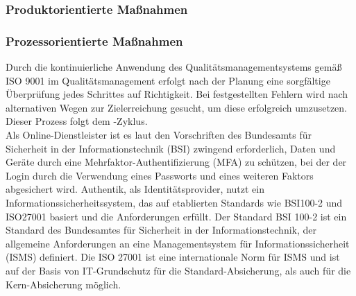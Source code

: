 \subsubsection{Produktorientierte Maßnahmen}
\label{sec:ProduktorientierteMaßnahmen}

\subsubsection{Prozessorientierte Maßnahmen}
\label{sec:ProzessorientierteMaßnahmen}
Durch die kontinuierliche Anwendung des Qualitätsmanagementsystems gemäß ISO 9001 im Qualitätsmanagement erfolgt nach der Planung 
eine sorgfältige Überprüfung jedes Schrittes auf Richtigkeit. Bei festgestellten Fehlern wird nach alternativen Wegen zur 
Zielerreichung gesucht, um diese erfolgreich umzusetzen. Dieser Prozess folgt dem \cite{pdca}-Zyklus.
\\Als Online-Dienstleister ist es laut den Vorschriften des Bundesamts für Sicherheit in der Informationstechnik (BSI) 
zwingend erforderlich, Daten und Geräte durch eine Mehrfaktor-Authentifizierung (\acs{MFA}) zu schützen, bei der der Login durch 
die Verwendung eines Passworts und eines weiteren Faktors abgesichert wird. Authentik, als Identitätsprovider, nutzt ein 
Informationssicherheitssystem, das auf etablierten Standards wie BSI100-2 und ISO27001 basiert und die Anforderungen erfüllt.
Der Standard \acs{BSI} 100-2 ist ein Standard des Bundesamtes für Sicherheit in der Informationstechnik, der allgemeine Anforderungen 
an eine Managementsystem für Informationssicherheit (\acs{ISMS}) definiert. Die ISO 27001 ist eine internationale Norm für \acs{ISMS} 
und ist auf der Basis von IT-Grundschutz für die Standard-Absicherung, als auch für die Kern-Absicherung möglich.
